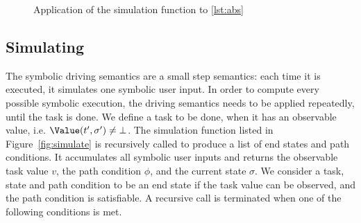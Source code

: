 \begin{figure*}
\caption{Application of the simulation function to \cref{lst:abs}}
\label{diagram:simapp}
\end{figure*}



\subsection{Simulating}
\label{subsec:driving}

The symbolic driving semantics are a small step semantics:
each time it is executed, it simulates one symbolic user input.
In order to compute every possible symbolic execution, the driving semantics needs to be applied repeatedly, until the task is done.
We define a task to be done, when it has an observable value,
i.e. $\Value(t', \sigma') \neq \bot$.
The simulation function listed in Figure~\ref{fig:simulate} is recursively called to produce a list of end states and path conditions.
It accumulates all symbolic user inputs and returns the observable task value $v$, the path condition $\phi$, and the current state $\sigma$.
We consider a task, state and path condition to be an end state if the task value can be observed, and the path condition is satisfiable.
A recursive call is terminated when one of the following conditions is met.

